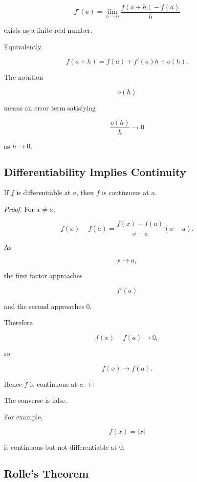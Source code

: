 \[
\boxed{
f'(a)
=
\lim_{h\to0}
\frac{f(a+h)-f(a)}{h}
}
\]

exists as a finite real number.

Equivalently,

\[
\boxed{
f(a+h)
=
f(a)
+
f'(a)h
+
o(h).
}
\]

The notation

\[
o(h)
\]

means an error term satisfying

\[
\frac{o(h)}{h}\to0
\]

as \(h\to0\).

\subsection{Differentiability Implies Continuity}
\label{subsec:differentiability-implies-continuity}

\begin{theorem}
If \(f\) is differentiable at \(a\), then \(f\) is continuous at \(a\).
\end{theorem}

\begin{proof}
For \(x\neq a\),

\[
f(x)-f(a)
=
\frac{f(x)-f(a)}{x-a}(x-a).
\]

As

\[
x\to a,
\]

the first factor approaches

\[
f'(a)
\]

and the second approaches \(0\).

Therefore

\[
f(x)-f(a)\to0,
\]

so

\[
f(x)\to f(a).
\]

Hence \(f\) is continuous at \(a\).
\end{proof}

The converse is false.

For example,

\[
f(x)=|x|
\]

is continuous but not differentiable at \(0\).

\subsection{Rolle's Theorem}
\label{subsec:rolles-theorem}

